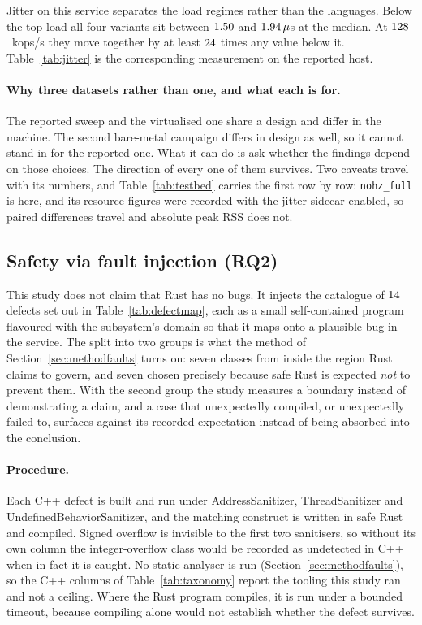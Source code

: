 \documentclass[english,oneside,a4paper,censored,csm,software-track-2020]{HYthesisML}
\begin{document}
Jitter on this service separates the load regimes rather than the languages. Below the top load
all four variants sit between $1.50$ and $1.94\,\mu$s at the median.
At $128$~kops/s they move together by at least $24$ times any value
below it. Table~\ref{tab:jitter} is the corresponding measurement on the reported host.

\paragraph{Why three datasets rather than one, and what each is for.}
The reported sweep and the virtualised one share a design and differ in the machine. The second
bare-metal campaign differs in design as well, so it cannot stand in for the reported one. What
it can do is ask whether the findings depend on those choices. The direction of every one of them
survives. Two caveats travel with its numbers, and Table~\ref{tab:testbed} carries the first
row by row: \texttt{nohz\_full} is \BmNohzFull{} here, and its resource figures were recorded with
the jitter sidecar enabled, so paired differences travel and absolute peak RSS does not.

\subsection{Safety via fault injection (RQ2)}\label{sec:safetyresults}
This study does not claim that Rust has no bugs. It injects the catalogue of
$14$ defects set out
in Table~\ref{tab:defectmap}, each as a small self-contained program
flavoured with the subsystem's domain so that it maps onto a plausible bug in the service. The
split into two groups is what the method of Section~\ref{sec:methodfaults} turns on: seven
classes from inside the region Rust claims to govern, and seven chosen precisely because safe
Rust is expected \emph{not} to prevent them. With the second group the study measures a boundary
instead of demonstrating a claim, and a case that unexpectedly compiled, or unexpectedly failed
to, surfaces against its recorded expectation instead of being absorbed into the conclusion.

\paragraph{Procedure.}
Each C++ defect is built and run under AddressSanitizer, ThreadSanitizer and
UndefinedBehaviorSanitizer, and the matching construct is written in safe Rust and compiled.
Signed overflow is invisible to the first two sanitisers, so without its own column the integer-overflow
class would be recorded as undetected in C++ when in fact it is caught. No static analyser is
run (Section~\ref{sec:methodfaults}), so the C++ columns of Table~\ref{tab:taxonomy} report the
tooling this study ran and not a ceiling. Where the Rust program compiles, it is run under a
bounded timeout, because compiling alone would not establish whether the defect survives.
\end{document}
